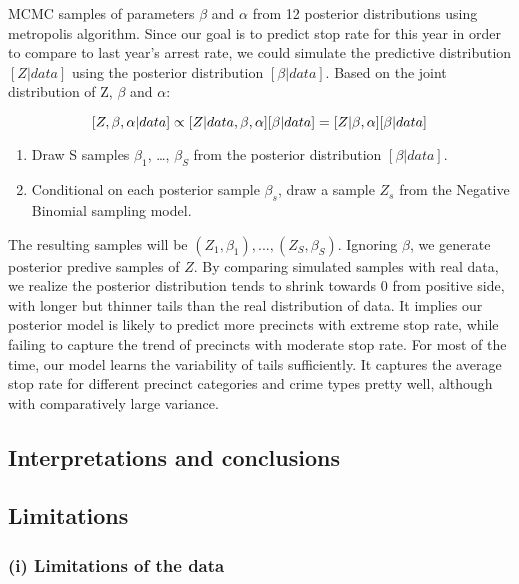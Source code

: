 \documentclass[]{article}
\providecommand{\tightlist}{%
  \setlength{\itemsep}{0pt}\setlength{\parskip}{0pt}}
\begin{document}
MCMC samples of parameters \(\beta\) and \(\alpha\) from 12 posterior
distributions using metropolis algorithm. Since our goal is to predict
stop rate for this year in order to compare to last year's arrest rate,
we could simulate the predictive distribution \([Z|data]\) using the
posterior distribution \([\beta|data]\). Based on the joint distribution
of Z, \(\beta\) and \(\alpha\):

\[
[Z, \beta, \alpha|data] \propto [Z|data, \beta, \alpha][\beta|data]\\
=[Z|\beta, \alpha][\beta|data]
\]

\begin{enumerate}
\def\labelenumi{\arabic{enumi}.}
\tightlist
\item
  Draw S samples \(\beta_1\), \ldots{}, \(\beta_S\) from the posterior
  distribution \([\beta|data]\).
\item
  Conditional on each posterior sample \(\beta_s\), draw a sample
  \(Z_s\) from the Negative Binomial sampling model.
\end{enumerate}

The resulting samples will be \((Z_1, \beta_1), ..., (Z_S, \beta_S)\).
Ignoring \(\beta\), we generate posterior predive samples of \(Z\). By
comparing simulated samples with real data, we realize the posterior
distribution tends to shrink towards 0 from positive side, with longer
but thinner tails than the real distribution of data. It implies our
posterior model is likely to predict more precincts with extreme stop
rate, while failing to capture the trend of precincts with moderate stop
rate. For most of the time, our model learns the variability of tails
sufficiently. It captures the average stop rate for different precinct
categories and crime types pretty well, although with comparatively
large variance.

\hypertarget{interpretations-and-conclusions}{%
\subsection{Interpretations and
conclusions}\label{interpretations-and-conclusions}}

\hypertarget{limitations}{%
\subsection{Limitations}\label{limitations}}

\hypertarget{i-limitations-of-the-data}{%
\subsubsection{(i) Limitations of the
data}\label{i-limitations-of-the-data}}
\end{document}
